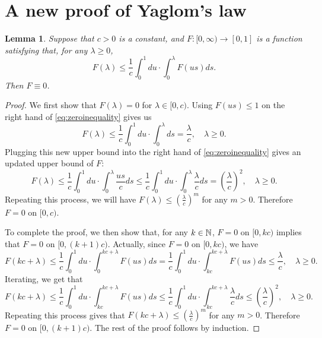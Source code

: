 \documentclass[12pt]{amsart}
\newtheorem{lem}[thm]{Lemma}
\numberwithin{equation}{section}
\newcommand{\expr}[1]{\left( #1 \right)}
\begin{document}
\section{A new proof of Yaglom's law}
\label{sec:anewproofofyaglomslaw}
\begin{lem}
\label{lem:zeroinequality}
    Suppose that $c>0$ is a constant, and $F:[0,\infty)\to [0,1]$  is
    a function satisfying that, for any $\lambda\geq 0$,
\begin{equation}
\label{eq:zeroinequality}
	    F(\lambda)
	\leq
	    \frac{1}{c}\int_0^1du
	\cdot
	    \int_0^\lambda F(us)ds.
\end{equation}
    Then $F\equiv 0$.
\end{lem}
\begin{proof}
	We first show that $F(\lambda)=0$ for $\lambda \in [0,c)$.
    Using  $F(us)\leq 1$ on the right hand of \eqref{eq:zeroinequality} gives us
\begin{equation*}
        F(\lambda)
    \leq
        \frac{1}{c}\int_0^1du
    \cdot
	    \int_0^\lambda ds
	=
	    \frac{\lambda}{c},
	\quad
		\lambda\geq 0.
\end{equation*}
	Plugging this new upper bound into the right hand of \eqref{eq:zeroinequality} gives an updated upper bound of $F$:
\begin{equation*}
        F(\lambda)
    \leq
        \frac{1}{c}\int_0^1du
    \cdot
	    \int_0^\lambda \frac{us}{c}ds
	\leq
        \frac{1}{c}\int_0^1du
    \cdot
	    \int_0^\lambda \frac{\lambda}{c}ds
	=
	    \expr{\frac{\lambda}{c}}^2,
	\quad
		\lambda\geq 0.
\end{equation*}
    Repeating this process, we will have $F(\lambda)\leq (\frac{\lambda}{c})^m$ for any $m>0$. Therefore $F=0$ on $[0,c)$.
\par
    To complete the proof, we then show that, for any $k\in\mathbb N$, $F=0$ on $[0,kc)$ implies that $F=0$ on $[0,(k+1)c)$.
	Actually, since $F=0$ on $[0,kc)$, we have
\begin{equation*}
	    F\expr{kc+\lambda}
	\leq
		\frac{1}{c}\int_0^1 du\cdot\int_0^{kc+\lambda}F(us)ds
	=
		\frac{1}{c}\int_0^1du\cdot\int_{kc}^{kc+\lambda}
	    F(us)ds\leq\frac{\lambda}{c}, \quad \lambda\geq 0.
\end{equation*}
	Iterating, we get that
\begin{equation*}
	    F(kc+\lambda)
	\leq
	   	    \frac{1}{c}\int_0^1du\cdot\int_{kc}^{kc+\lambda} F(us)ds
	\leq
	    	    \frac{1}{c}\int_0^1du\cdot\int_{kc}^{kc+\lambda} \frac{\lambda}{c}ds
	\leq
		\expr{\frac{\lambda}{c}}^2, \quad \lambda\geq 0.
\end{equation*}
	Repeating this process gives that $F(kc+\lambda)\leq (\frac{\lambda}{c})^m$ for any $m>0$. Therefore $F=0$ on $[0,(k+1)c)$. The rest of the proof follows by induction.
\end{proof}
\end{document}
